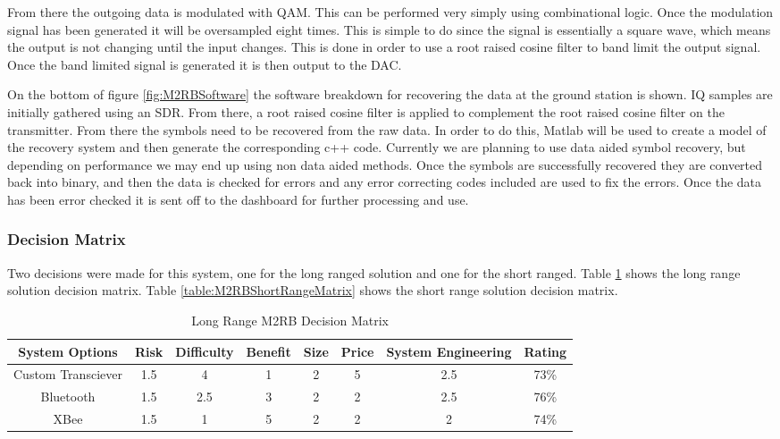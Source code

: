 \documentclass[crop=false]{standalone}
\begin{document}
        From there the outgoing data is modulated with QAM. This can be performed very simply using combinational logic. Once the modulation signal has been generated it will be oversampled eight times. This is simple to do since the signal is essentially a square wave, which means the output is not changing until the input changes. This is done in order to use a root raised cosine filter to band limit the output signal. Once the band limited signal is generated it is then output to the DAC.
        
        On the bottom of figure \ref{fig:M2RBSoftware} the software breakdown for recovering the data at the ground station is shown. IQ samples are initially gathered using an SDR. From there, a root raised cosine filter is applied to complement the root raised cosine filter on the transmitter. From there the symbols need to be recovered from the raw data. In order to do this, Matlab will be used to create a model of the recovery system and then generate the corresponding c++ code. Currently we are planning to use data aided symbol recovery, but depending on performance we may end up using non data aided methods. Once the symbols are successfully recovered they are converted back into binary, and then the data is checked for errors and any error correcting codes included are used to fix the errors. Once the data has been error checked it is sent off to the dashboard for further processing and use.
            
    \subsubsection{Decision Matrix}
        
        Two decisions were made for this system, one for the long ranged solution and one for the short ranged. Table \ref{table:M2RBLongRangeMatrix} shows the long range solution decision matrix. Table \ref{table:M2RBShortRangeMatrix} shows the short range solution decision matrix.
            
        \begin{table}[H]
        \begin{center}
        \begin{tabular}{|c|c|c|c|c|c|c|c|}

        \hline
        System Options & Risk & Difficulty & Benefit & Size & Price & System Engineering & Rating\\ \hline
        Custom Transciever & 1.5 & 4 & 1 & 2 & 5 & 2.5 & 73\% \\ \hline
        Bluetooth & 1.5 & 2.5 & 3 & 2 & 2 & 2.5 & 76\% \\ \hline
        XBee & 1.5 & 1 & 5 & 2 & 2 & 2 & 74\% \\ \hline
        \end{tabular}
        \caption{Long Range M2RB Decision Matrix}
        \label{table:M2RBLongRangeMatrix}
        \end{center}
        \end{table}
            
\end{document}
